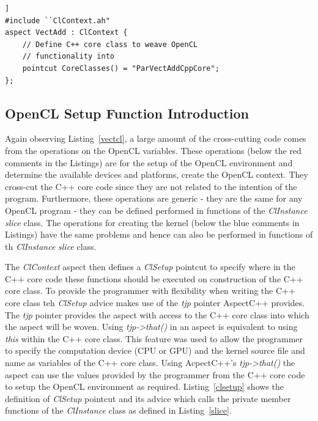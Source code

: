 \documentclass{sig-alternate-05-2015}
\begin{document}
\begin{lstlisting}[caption=Derived aspect defining the core classes which need
the OpenCL variables,label=dslice,float=[!t]]
#include ``ClContext.ah"
aspect VectAdd : ClContext {
	// Define C++ core class to weave OpenCL 
	// functionality into
	pointcut CoreClasses() = "ParVectAddCppCore";
};
\end{lstlisting}

\subsection{OpenCL Setup Function Introduction}

Again observing Listing~\ref{vectcl}, a large amount of the cross-cutting code
comes from the operations on the OpenCL variables. These operations (below the
red comments in the Listings) are for the setup of the OpenCL environment and 
determine the available devices and platforms, create the OpenCL context. They
cross-cut the C++ core code since they are not related to the intention of the
program. Furthermore, these operations are generic - they are the same for any 
OpenCL program - they can be defined performed in functions of the \textit{ClInstance} 
\textit{slice} class. The operations for creating the kernel (below the blue 
comments in Listings) have the same problems and hence can also be performed 
in functions of th \textit{ClInstance} \textit{slice} class. 

The \textit{ClContext} aspect then defines a \textit{ClSetup} pointcut to
specify where in the C++ core code these functions should be executed on
construction of the C++ core class. To provide the programmer with flexibility 
when writing the C++ core class teh \textit{ClSetup} advice makes use of the
\textit{tjp} pointer AspectC++ provides. The \textit{tjp} pointer provides the
aspect with access to the C++ core class into which the aspect will be woven.
Using \textit{tjp->that()} in an aspect is equivalent to using \textit{this}
within the C++ core class. This feature was used to allow the programmer to
specify the computation device (CPU or GPU) and the kernel source file and name
as variables of the C++ core class. Using AcpectC++'s \textit{tjp->that()}
the aspect can use the values provided by the programmer from the C++ core code
to setup the OpenCL environment as required. 
Listing~\ref{clsetup} shows the definition of \textit{ClSetup} pointcut and its 
advice which calls the private member functions of the \textit{ClInstance} class 
as defined in Listing~\ref{slice}.
\end{document}
